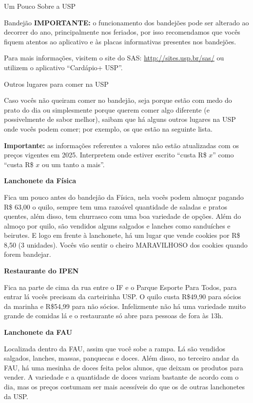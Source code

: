 \begin{secao}{Um Pouco Sobre a USP}
\begin{subsecao}{Bandejão}
\textbf{IMPORTANTE:} o funcionamento dos bandejões pode ser alterado ao decorrer do ano,
principalmente nos feriados, por isso recomendamos que vocês fiquem atentos ao 
aplicativo e às placas informativas presentes nos bandejões.

Para mais informações, visitem o site do SAS: \url{http://sites.usp.br/sas/} ou
utilizem o aplicativo ``Cardápio+ USP''.

\end{subsecao}

\begin{subsecao}{Outros lugares para comer na USP}

Caso vocês não queiram comer no bandejão, seja porque estão com medo do
prato do dia ou simplesmente porque querem comer algo diferente (e
possivelmente de sabor melhor), saibam que há alguns outros lugares na USP onde
vocês podem comer; por exemplo, os que estão na seguinte lista.

\textbf{Importante:} as informações referentes a valores não estão atualizadas com
os preços vigentes em 2025. Interpretem onde estiver escrito ``custa R\$ $x$'' 
como ``custa R\$ $x$ ou um tanto a mais''.

\textbf{Lanchonete da Física}

Fica um pouco antes do bandejão da Física, nela vocês podem almoçar pagando R\$
63,00 o quilo, sempre tem uma razoável quantidade de saladas e pratos
quentes, além disso, tem churrasco com uma boa variedade de opções.
Além do almoço por quilo, são vendidos alguns salgados e lanches como sanduíches e
beirutes. E logo em frente à lanchonete, há um lugar que vende cookies por R\$
8,50 (3 unidades). Vocês vão sentir o cheiro MARAVILHOSO dos cookies quando forem bandejar.

\textbf{Restaurante do IPEN}

Fica na parte de cima da rua entre o IF e o Parque Esporte Para Todos, para
entrar lá vocês precisam da carteirinha USP. O quilo custa R\$49,90 para sócios da marinha 
e R\$54,99 para não sócios. Infelizmente não há uma variedade muito grande de comidas lá e o
restaurante só abre para pessoas de fora às 13h.

\textbf{Lanchonete da FAU}

Localizada dentro da FAU, assim que você sobe a rampa. Lá são vendidos salgados, lanches, 
massas, panquecas e doces. Além disso, no terceiro andar da FAU, há uma mesinha de doces feita 
pelos alunos, que deixam os produtos para vender. A variedade e a quantidade de doces variam bastante 
de acordo com o dia, mas os preços costumam ser mais acessíveis do que os de outras lanchonetes da USP.


\end{subsecao}
\end{secao}
